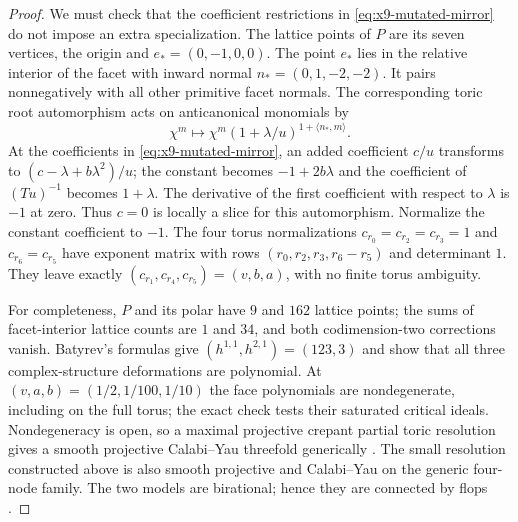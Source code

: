 \begin{proof}
We must check that the coefficient restrictions in
\eqref{eq:x9-mutated-mirror} do not impose an extra specialization.
The lattice points of $P$ are its seven vertices, the origin and
$e_*=(0,-1,0,0)$. The point $e_*$ lies in the relative interior
of the facet with inward normal $n_*=(0,1,-2,-2)$.
It pairs nonnegatively with all other primitive facet normals.
The corresponding toric root automorphism acts on anticanonical
monomials by
\begin{equation}
 \chi^m\longmapsto
 \chi^m(1+\lambda/u)^{1+\langle n_*,m\rangle}.
 \label{eq:x9-mirror-root-gauge}
\end{equation}
At the coefficients in \eqref{eq:x9-mutated-mirror}, an added
coefficient $c/u$ transforms to $(c-\lambda+b\lambda^2)/u$;
the constant becomes $-1+2b\lambda$ and the coefficient of
$(Tu)^{-1}$ becomes $1+\lambda$. The derivative of the first
coefficient with respect to $\lambda$ is $-1$ at zero. Thus
$c=0$ is locally a slice for this automorphism. Normalize the
constant coefficient to $-1$. The four torus normalizations
$c_{r_0}=c_{r_2}=c_{r_3}=1$ and $c_{r_6}=c_{r_5}$ have
exponent matrix with rows
$(r_0,r_2,r_3,r_6-r_5)$ and determinant $1$. They leave exactly
$(c_{r_1},c_{r_4},c_{r_5})=(v,b,a)$, with no finite torus
ambiguity.

For completeness, $P$ and its polar have $9$ and $162$ lattice
points; the sums of facet-interior lattice counts are $1$ and
$34$, and both codimension-two corrections vanish. Batyrev's
formulas give $(h^{1,1},h^{2,1})=(123,3)$ and show that all
three complex-structure deformations are polynomial. At
$(v,a,b)=(1/2,1/100,1/10)$ the face polynomials are
nondegenerate, including on the full torus; the exact check
tests their saturated critical ideals. Nondegeneracy is open,
so a maximal projective crepant partial toric resolution gives
a smooth projective Calabi--Yau threefold generically
\cite[Section~4.5]{Batyrev:1994}.
The small resolution constructed above is also smooth projective
and Calabi--Yau on the generic four-node family. The two models
are birational; hence they are connected by flops
\cite[Theorem~1]{Kawamata:2007Flops}.
\end{proof}

